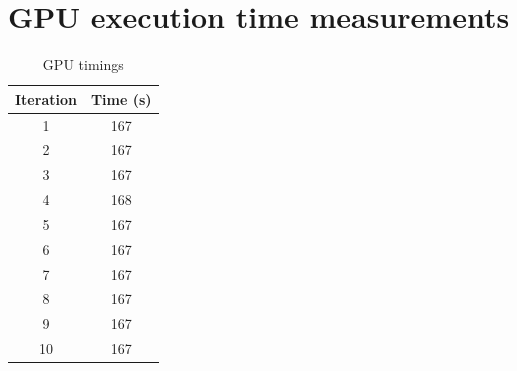 \documentclass[journal,transmag]{IEEEtran}
\begin{document}
    \section{GPU execution time measurements}
     \begin{table}[h]
        \centering
        \caption{GPU timings}
        \label{GPUTableRaw}
        \begin{tabular}{ c c }
            Iteration & Time (s) \\
            \hline
            \hline
                1     & 167 \\
                2     & 167 \\
                3     & 167 \\
                4     & 168 \\
                5     & 167 \\
                6     & 167 \\
                7     & 167 \\
                8     & 167 \\
                9     & 167 \\
                10    & 167 \\
       \end{tabular}
    \end{table}
\end{document}
